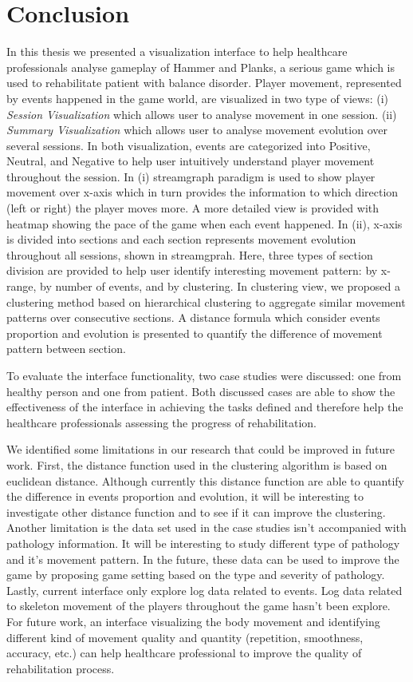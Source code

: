\chapter{Conclusion}

In this thesis we presented a visualization interface to help healthcare professionals analyse gameplay of Hammer and Planks, a serious game which is used to rehabilitate patient with balance disorder. Player movement, represented by events happened in the game world, are visualized in two type of views: (i) \textit{Session Visualization} which allows user to analyse movement in one session. (ii) \textit{Summary Visualization} which allows user to analyse movement evolution over several sessions. In both visualization, events are categorized into Positive, Neutral, and Negative to help user intuitively understand player movement throughout the session. In (i) streamgraph paradigm is used to show player movement over x-axis which in turn provides the information to which direction (left or right) the player moves more. A more detailed view is provided with heatmap showing the pace of the game when each event happened. In (ii), x-axis is divided into sections and each section represents movement evolution throughout all sessions, shown in streamgprah. Here, three types of section division are provided to help user identify interesting movement pattern: by x-range, by number of events, and by clustering. In clustering view, we proposed a clustering method based on hierarchical clustering to aggregate similar movement patterns over consecutive sections. A distance formula which consider events proportion and evolution is presented to quantify the difference of movement pattern between section.

To evaluate the interface functionality, two case studies were discussed: one from healthy person and one from patient. Both discussed cases are able to show the effectiveness of the interface in achieving the tasks defined and therefore help the healthcare professionals assessing the progress of rehabilitation.

We identified some limitations in our research that could be improved in future work. First, the distance function used in the clustering algorithm is based on euclidean distance. Although currently this distance function are able to quantify the difference in events proportion and evolution, it will be interesting to investigate other distance function and to see if it can improve the clustering. Another limitation is the data set used in the case studies isn't accompanied with pathology information. It will be interesting to study different type of pathology and it's movement pattern. In the future, these data can be used to improve the game by proposing game setting based on the type and severity of pathology. Lastly, current interface only explore log data related to events. Log data related to skeleton movement of the players throughout the game hasn't been explore. For future work, an interface visualizing the body movement and identifying different kind of movement quality and quantity (repetition, smoothness, accuracy, etc.) can help healthcare professional to improve the quality of rehabilitation process.


